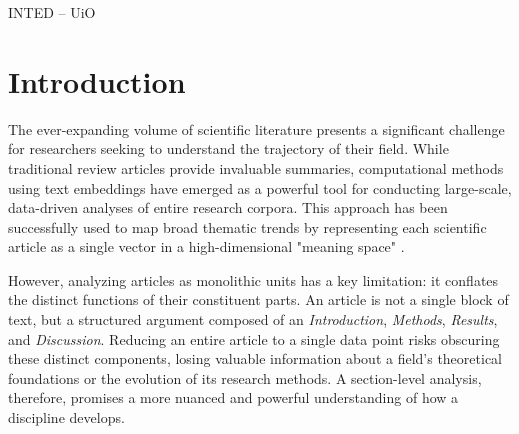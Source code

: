 \documentclass[12pt]{article}
\begin{document}
\begin{titlepage}
    \vspace{1.5cm}

    {\fontsize{10pt}{12pt}\selectfont
        \noindent
        \begin{minipage}[t]{0.5\textwidth}
            \centering
            INTED -- UiO \end{minipage}\hfill
        \begin{minipage}[t]{0.5\textwidth}
            \centering
            \thedate
        \end{minipage}
    }
\end{titlepage}


\tableofcontents
\thispagestyle{empty}

\clearpage


\pagestyle{plain}


\section{Introduction}

The ever-expanding volume of scientific literature presents a significant
challenge for researchers seeking to understand the trajectory of their field.
While traditional review articles provide invaluable summaries, computational
methods using text embeddings have emerged as a powerful tool for conducting
large-scale, data-driven analyses of entire research corpora. This approach has
been successfully used to map broad thematic trends by representing each
scientific article as a single vector in a high-dimensional "meaning space"
\autocite{Odden2024Using}.

However, analyzing articles as monolithic units has a key limitation: it
conflates the distinct functions of their constituent parts. An
article is not a single block of text, but a structured argument composed of an
\emph{Introduction}, \emph{Methods}, \emph{Results}, and \emph{Discussion}.
Reducing an entire article to a single data point risks obscuring these
distinct components, losing valuable information about a field's theoretical
foundations or the evolution of its research methods. A section-level analysis,
therefore, promises a more nuanced and powerful understanding of how a discipline
develops.
\end{document}
